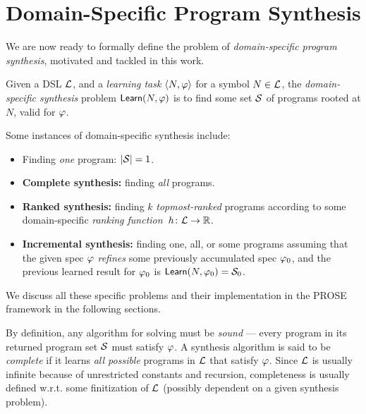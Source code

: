 \section{Domain-Specific Program Synthesis}
\label{sec:background:problem}
We are now ready to formally define the problem of \emph{domain-specific program synthesis}, motivated and tackled in
this work.

\begin{problem}
    \label{problem:syn:general}
    Given a DSL $\mathcal{L}$, and a \emph{learning task} $\langle N, \varphi\rangle$ for a symbol $N \in \mathcal{L}$, the
    \emph{domain\hyp{}specific synthesis} problem $\mathsf{Learn}(N, \varphi)$ is to find some set $\mathcal{S}$ of programs
    rooted at $N$, valid for $\varphi$.

    Some instances of domain-specific synthesis include:
    \begin{itemize}[nosep]
        \item Finding \emph{one} program: $|\mathcal{S}| = 1$.
        \item \textbf{Complete synthesis:} finding \emph{all} programs.
        \item \textbf{Ranked synthesis:} finding $k$ \emph{topmost-ranked} programs according to some domain-specific
            \emph{ranking function}~$h\colon\mathcal{L} \to \mathbb{R}$.
        \item \textbf{Incremental synthesis:} finding one, all, or some programs assuming that the given spec $\varphi$
            \emph{refines} some previously accumulated spec $\varphi_0$, and the previous learned result for $\varphi_0$ is
            $\mathsf{Learn}(N, \varphi_0) = \mathcal{S}_0$.
    \end{itemize}
    We discuss all these specific problems and their implementation in the PROSE framework in the following sections.
\end{problem}

By definition, any algorithm for solving  must be \emph{sound} --- every program in its
returned program set $\mathcal{S}$ must satisfy $\varphi$.
A synthesis algorithm is said to be \emph{complete} if it learns \emph{all possible} programs in $\mathcal{L}$ that satisfy $\varphi$.
Since $\mathcal{L}$ is usually infinite because of unrestricted constants and recursion, completeness is usually defined w.r.t.
some finitization of $\mathcal{L}$ (possibly dependent on a given synthesis problem).
